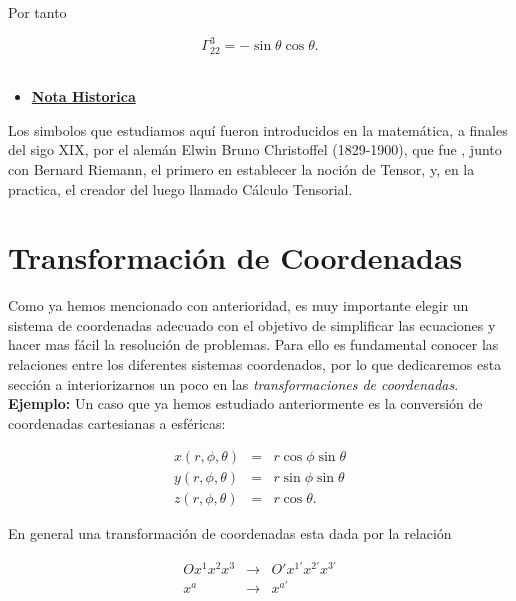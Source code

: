 \documentclass[12pt]{report}
\begin{document}
Por tanto

\begin{equation} \label{2.85}
\Gamma_{22}^3=-\sin \theta \cos \theta.
\end{equation}
\\


\begin{itemize}
 \item \underline{\textbf{Nota Historica}} \\
\end{itemize}


 Los simbolos que estudiamos aquí fueron introducidos en la matemática, a finales del sigo XIX, por el alemán Elwin Bruno Christoffel (1829-1900), que fue , junto con Bernard Riemann, el primero en establecer la noción de Tensor, y, en la practica, el creador del luego llamado Cálculo Tensorial.






\section{Transformación de Coordenadas}

Como ya hemos mencionado con anterioridad, es muy importante elegir un sistema de coordenadas adecuado con el objetivo de simplificar las ecuaciones y hacer mas fácil la resolución de problemas. Para ello es fundamental conocer las relaciones entre los diferentes sistemas coordenados, por lo que dedicaremos esta sección a interiorizarnos un poco en las \textit{transformaciones de coordenadas}. \\ 



\textbf{Ejemplo:} Un caso que ya hemos estudiado anteriormente es la conversión de coordenadas cartesianas a esféricas:

\begin{eqnarray} \nonumber
x(r,\phi,\theta) &=& r \cos{\phi} \sin{\theta} \\ \nonumber
y(r,\phi,\theta) &=& r \sin{\phi} \sin{\theta} \\ \nonumber
z(r,\phi,\theta) &=& r \cos{\theta}.
\end{eqnarray}


En general una transformación de coordenadas esta dada por la relación

\begin{eqnarray} \nonumber
O x^1 x^2 x^3 &\longrightarrow& O' x^{1'} x^{2'} x^{3'} \\ \nonumber
x^a &\longrightarrow& x^{a'}
\end{eqnarray}
\end{document}
